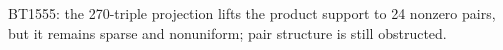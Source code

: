 \begin{center}\small
BT1555: the 270-triple projection lifts the product support to 24 nonzero pairs, but it remains sparse and nonuniform; pair structure is still obstructed.
\end{center}
